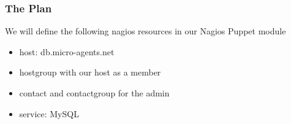 \documentclass[10pt]{beamer}
\begin{document}
\begin{frame}
  \frametitle{The Plan}
  
  We will define the following nagios resources in our Nagios Puppet module
\begin{itemize}
\item host:  db.micro-agents.net
\item hostgroup with our host as a member
\item contact and contactgroup for the admin
\item service:  MySQL
\end{itemize}
\end{frame}



%
%
\end{document}
